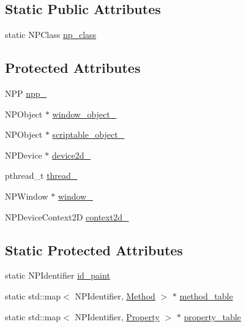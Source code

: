 \subsection*{Static Public Attributes}
\begin{DoxyCompactItemize}
\item 
static NPClass \hyperlink{classbridge_1_1_scripting_bridge_a7a3e8318e9e315a116729cebceac5fd9}{np\_\-class}
\end{DoxyCompactItemize}
\subsection*{Protected Attributes}
\begin{DoxyCompactItemize}
\item 
NPP \hyperlink{classbridge_1_1_scripting_bridge_a122d088702ccb290a91a0cb1c507fbbe}{npp\_\-}
\item 
NPObject $\ast$ \hyperlink{classbridge_1_1_scripting_bridge_a59bc10d2500b138998dc973aee38039e}{window\_\-object\_\-}
\item 
NPObject $\ast$ \hyperlink{classbridge_1_1_scripting_bridge_a2f4a3c451a7056118de408d2d28d3936}{scriptable\_\-object\_\-}
\item 
NPDevice $\ast$ \hyperlink{classbridge_1_1_scripting_bridge_ad3a2e16a43b8a18b888ad880abd472c8}{device2d\_\-}
\item 
pthread\_\-t \hyperlink{classbridge_1_1_scripting_bridge_a58b77b4f3b290be810a88c67ba61db9d}{thread\_\-}
\item 
NPWindow $\ast$ \hyperlink{classbridge_1_1_scripting_bridge_ab23772fde4cbff4bc65520d589c8adac}{window\_\-}
\item 
NPDeviceContext2D \hyperlink{classbridge_1_1_scripting_bridge_ae8d47779a04203f58420dc3d9c88b063}{context2d\_\-}
\end{DoxyCompactItemize}
\subsection*{Static Protected Attributes}
\begin{DoxyCompactItemize}
\item 
static NPIdentifier \hyperlink{classbridge_1_1_scripting_bridge_af9fe1c1d57b6fb113b2e0da63128807d}{id\_\-paint}
\item 
static std::map$<$ NPIdentifier, \hyperlink{classbridge_1_1_scripting_bridge_aa2d60d52b4e91aa7659850b73f393727}{Method} $>$ $\ast$ \hyperlink{classbridge_1_1_scripting_bridge_a1057c4c6b923babcbc62a5732d2c3235}{method\_\-table}
\item 
static std::map$<$ NPIdentifier, \hyperlink{classbridge_1_1_scripting_bridge_a9063ac1ad0b4e1a439e954e7a505057d}{Property} $>$ $\ast$ \hyperlink{classbridge_1_1_scripting_bridge_a84c8336a6ba799945dfe31358d389a62}{property\_\-table}
\end{DoxyCompactItemize}


